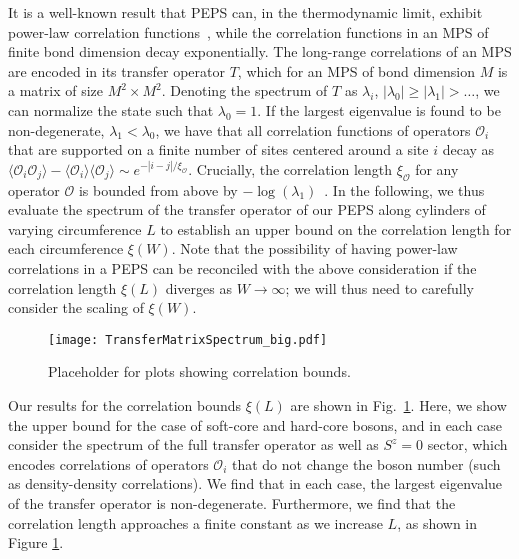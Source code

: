 It is a well-known result that PEPS can, in the thermodynamic limit,
exhibit power-law correlation functions~\cite{?}, while the correlation
functions in an MPS of finite bond dimension decay exponentially. The
long-range correlations of an MPS are encoded in its transfer operator $T$,
which for an MPS of bond dimension $M$ is a matrix of size $M^2 \times M^2$.
Denoting the spectrum of $T$ as $\lambda_i$, $|\lambda_0| \geq |\lambda_1| > \ldots$,
we can normalize the state such that $\lambda_0 = 1$. If the largest eigenvalue
is found to be non-degenerate, $\lambda_1 < \lambda_0$, we have that all correlation
functions of operators $\mathcal{O}_i$ that are supported on a finite number of sites centered
around a site $i$ decay as
$\langle \mathcal{O}_i \mathcal{O}_j \rangle - \langle \mathcal{O}_i \rangle \langle \mathcal{O}_j \rangle \sim e^{-|i-j|/\xi_\mathcal{O}}$.
Crucially, the correlation length $\xi_\mathcal{O}$ for any operator $\mathcal{O}$
is bounded from above by $-\log(\lambda_1)$~\cite{?}. In the following, we thus
evaluate the spectrum of the transfer operator of our PEPS along cylinders of varying
circumference $L$ to establish an upper bound on the correlation length for each
circumference $\xi(W)$.
Note that the possibility of having power-law correlations in a PEPS can
be reconciled with the above consideration if the correlation length $\xi(L)$
diverges as $W \rightarrow \infty$; we will thus need to carefully consider the scaling
of $\xi(W)$.

\begin{figure}[hbtc]
	\centering
	\texttt{[image: TransferMatrixSpectrum\_big.pdf]}
	\caption{Placeholder for plots showing correlation bounds.}
	\label{fig:TMS}
\end{figure}

Our results for the correlation bounds $\xi(L)$ are shown in Fig.~\ref{fig:TMS}.
Here, we show the upper bound for the case of soft-core and hard-core bosons,
and in each case consider the spectrum of the full transfer operator as well
as $S^z=0$ sector, which encodes correlations of operators $\mathcal{O}_i$ that do not
change the boson number (such as density-density correlations).
We find that in each case, the largest eigenvalue of the transfer operator is
non-degenerate. Furthermore, we find
that the correlation length approaches a finite constant as we
increase $L$, as shown in Figure \ref{fig:TMS}.
